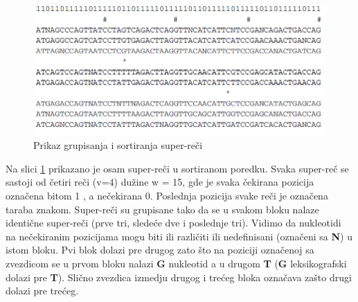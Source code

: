 \documentclass[a4paper]{article}
\begin{document}
{\begin{figure}[h!]
\begin{center}
\end{center}
\includegraphics[width=\textwidth]{superreci}
\caption{Prikaz grupisanja i sortiranja super-reči}
\label{fig:superreci}
\end{figure}

\indent Na slici \ref{fig:superreci} prikazano je osam super-reči u sortiranom poredku. Svaka super-reč se sastoji od četiri reči (v=4) dužine w = 15, gde je svaka čekirana pozicija označena bitom 1 , a nečekirana 0. Poslednja pozicija svake reči je označena taraba znakom. Super-reči su grupisane tako da se u svakom bloku nalaze identične super-reči (prve tri, sledeće dve i poslednje tri). Vidimo da nukleotidi na nečekiranim pozicijama mogu biti ili različiti ili nedefinisani (označeni sa \textbf{N}) u istom bloku. Pvi blok dolazi pre drugog zato što na poziciji označenoj sa zvezdicom se u prvom bloku nalazi \textbf{G} nukleotid a u drugom \textbf{T} (\textbf{G} leksikografski dolazi pre \textbf{T}). Slično zvezdica izmedju drugog i trećeg bloka označava zašto drugi dolazi pre trećeg.
}
\end{document}
